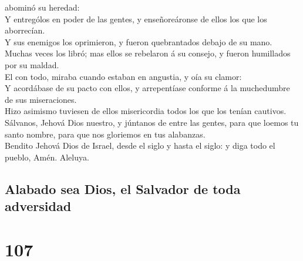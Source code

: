 abominó su heredad:\\
 Y entrególos en poder de las gentes, y enseñoreáronse de
ellos los que los aborrecían.\\
 Y sus enemigos los oprimieron, y fueron quebrantados
debajo de su mano.\\
 Muchas veces los libró; mas ellos se rebelaron á su
consejo, y fueron humillados por su maldad.\\
 El con todo, miraba cuando estaban en angustia, y oía su
clamor:\\
 Y acordábase de su pacto con ellos, y arrepentíase
conforme á la muchedumbre de sus miseraciones.\\
 Hizo asimismo tuviesen de ellos misericordia todos los que
los tenían cautivos.\\
 Sálvanos, Jehová Dios nuestro, y júntanos de entre las
gentes, para que loemos tu santo nombre, para que nos gloriemos en tus
alabanzas.\\
 Bendito Jehová Dios de Israel, desde el siglo y hasta el
siglo: y diga todo el pueblo, Amén. Aleluya.

\hypertarget{alabado-sea-dios-el-salvador-de-toda-adversidad}{%
\subsection{Alabado sea Dios, el Salvador de toda
adversidad}\label{alabado-sea-dios-el-salvador-de-toda-adversidad}}

\hypertarget{section-106}{%
\section{107}\label{section-106}}

